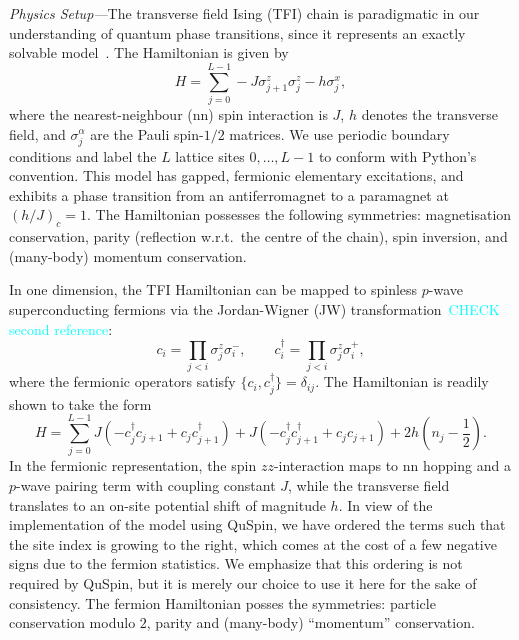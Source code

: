\documentclass{SciPost}
\newcommand\0{\scalebox{-1}[1]{0}}
\newcommand*{\cyan}{\textcolor{cyan}}
\begin{document}
\noindent\emph{Physics Setup---}The transverse field Ising (TFI) chain is paradigmatic in our understanding of quantum phase transitions, since it represents an exactly solvable model~\cite{sachdev_book}. The Hamiltonian is given by
\begin{equation}
H=\sum_{j=0}^{L-1}-J\sigma^z_{j+1}\sigma^z_j - h\sigma^x_j,
\label{eq:TFIM}
\end{equation} 
where the nearest-neighbour (nn) spin interaction is $J$, $h$ denotes the transverse field, and $\sigma^\alpha_j$ are the Pauli spin-$1/2$ matrices. We use periodic boundary conditions and label the $L$ lattice sites $0,\dots,L-1$ to conform with Python's convention. This model has gapped, fermionic elementary excitations, and exhibits a phase transition from an antiferromagnet to a paramagnet at $\left(h/J\right)_c=1$. The Hamiltonian possesses the following symmetries: magnetisation conservation, parity (reflection w.r.t.~the centre of the chain), spin inversion, and (many-body) momentum conservation.

In one dimension, the TFI Hamiltonian can be mapped to spinless $p$-wave superconducting fermions via the Jordan-Wigner (JW) transformation~\cite{sachdev_book,dziarmaga_10}\cyan{CHECK second reference}:
\begin{equation}
c_i=\prod_{j<i}\sigma^z_j\sigma^-_i,\qquad c^\dagger_i=\prod_{j<i}\sigma^z_j\sigma^+_i,
\label{eq:JW_transf}
\end{equation} 
where the fermionic operators satisfy $\{c_i,c^\dagger_j\}=\delta_{ij}$. The Hamiltonian is readily shown to take the form
\begin{equation}
H=\sum_{j=0}^{L-1}J\left(-c^\dagger_jc_{j+1} + c_jc^\dagger_{j+1} \right) +J\left( -c^\dagger_jc^\dagger_{j+1} + c_jc_{j+1}\right) + 2h\left(n_j-\frac{1}{2}\right).
\label{eq:TFIM_fermion}
\end{equation}
In the fermionic representation, the spin $zz$-interaction maps to nn hopping and a $p$-wave pairing term with coupling constant $J$, while the transverse field translates to an on-site potential shift of magnitude $h$. In view of the implementation of the model using QuSpin, we have ordered the terms such that the site index is growing to the right, which comes at the cost of a few negative signs due to the fermion statistics. We emphasize that this ordering is not required by QuSpin, but it is merely our choice to use it here for the sake of consistency. The fermion Hamiltonian posses the symmetries: particle conservation modulo $2$, parity and (many-body) ``momentum'' conservation.
\end{document}
